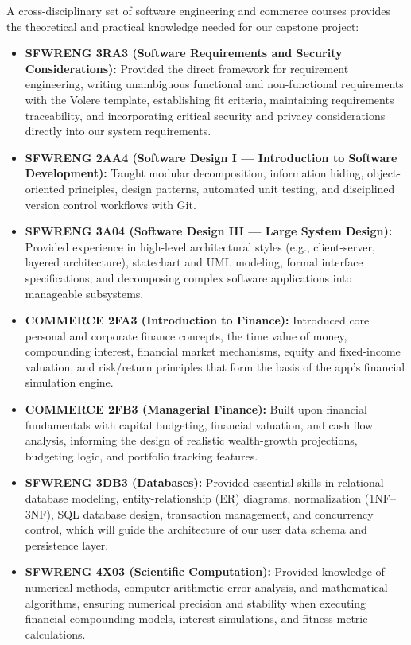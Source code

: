 \documentclass[12pt]{article}
\begin{document}
\begin{enumerate}
  A cross-disciplinary set of software engineering and commerce courses provides the theoretical and practical knowledge needed for our capstone project:
  \begin{itemize}
    \item \textbf{SFWRENG 3RA3 (Software Requirements and Security Considerations):} Provided the direct framework for requirement engineering, writing unambiguous functional and non-functional requirements with the Volere template, establishing fit criteria, maintaining requirements traceability, and incorporating critical security and privacy considerations directly into our system requirements.
    \item \textbf{SFWRENG 2AA4 (Software Design I --- Introduction to Software Development):} Taught modular decomposition, information hiding, object-oriented principles, design patterns, automated unit testing, and disciplined version control workflows with Git.
    \item \textbf{SFWRENG 3A04 (Software Design III --- Large System Design):} Provided experience in high-level architectural styles (e.g., client-server, layered architecture), statechart and UML modeling, formal interface specifications, and decomposing complex software applications into manageable subsystems.
    \item \textbf{COMMERCE 2FA3 (Introduction to Finance):} Introduced core personal and corporate finance concepts, the time value of money, compounding interest, financial market mechanisms, equity and fixed-income valuation, and risk/return principles that form the basis of the app's financial simulation engine.
    \item \textbf{COMMERCE 2FB3 (Managerial Finance):} Built upon financial fundamentals with capital budgeting, financial valuation, and cash flow analysis, informing the design of realistic wealth-growth projections, budgeting logic, and portfolio tracking features.
    \item \textbf{SFWRENG 3DB3 (Databases):} Provided essential skills in relational database modeling, entity-relationship (ER) diagrams, normalization (1NF--3NF), SQL database design, transaction management, and concurrency control, which will guide the architecture of our user data schema and persistence layer.
    \item \textbf{SFWRENG 4X03 (Scientific Computation):} Provided knowledge of numerical methods, computer arithmetic error analysis, and mathematical algorithms, ensuring numerical precision and stability when executing financial compounding models, interest simulations, and fitness metric calculations.
  \end{itemize}


\end{enumerate}
\end{document}
